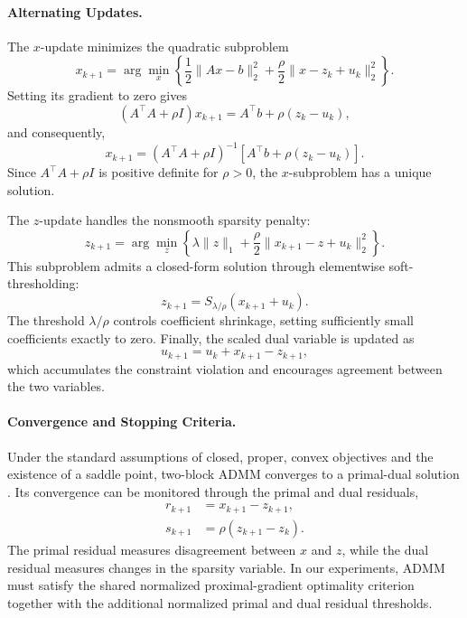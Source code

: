 \documentclass{article}
\begin{document}
\paragraph{Alternating Updates.}
The $x$-update minimizes the quadratic subproblem
\begin{equation}
x_{k+1}=
\arg\min_x
\left\{
\frac{1}{2}\|Ax-b\|_2^2+
\frac{\rho}{2}\|x-z_k+u_k\|_2^2
\right\}.
\end{equation}
Setting its gradient to zero gives
\begin{equation}
(A^\top A+\rho I)x_{k+1}
=A^\top b+\rho(z_k-u_k),
\end{equation}
and consequently,
\begin{equation}
x_{k+1}=
(A^\top A+\rho I)^{-1}
\left[A^\top b+\rho(z_k-u_k)\right].
\end{equation}
Since $A^\top A+\rho I$ is positive definite for
$\rho>0$, the $x$-subproblem has a unique solution.

The $z$-update handles the nonsmooth sparsity penalty:
\begin{equation}
z_{k+1}=
\arg\min_z
\left\{
\lambda\|z\|_1+
\frac{\rho}{2}\|x_{k+1}-z+u_k\|_2^2
\right\}.
\end{equation}
This subproblem admits a closed-form solution through
elementwise soft-thresholding:
\begin{equation}
z_{k+1}=S_{\lambda/\rho}(x_{k+1}+u_k).
\end{equation}
The threshold $\lambda/\rho$ controls coefficient
shrinkage, setting sufficiently small coefficients
exactly to zero. Finally, the scaled dual variable is
updated as
\begin{equation}
u_{k+1}=u_k+x_{k+1}-z_{k+1},
\end{equation}
which accumulates the constraint violation and
encourages agreement between the two variables.

\paragraph{Convergence and Stopping Criteria.}
Under the standard assumptions of closed, proper,
convex objectives and the existence of a saddle point,
two-block ADMM converges to a primal-dual solution
\citep{boyd2011}. Its convergence can be monitored
through the primal and dual residuals,
\begin{equation}
\begin{aligned}
r_{k+1}&=x_{k+1}-z_{k+1},\\
s_{k+1}&=\rho(z_{k+1}-z_k).
\end{aligned}
\end{equation}
The primal residual measures disagreement between
$x$ and $z$, while the dual residual measures changes
in the sparsity variable. In our experiments, ADMM
must satisfy the shared normalized proximal-gradient
optimality criterion together with the additional
normalized primal and dual residual thresholds.
\end{document}
